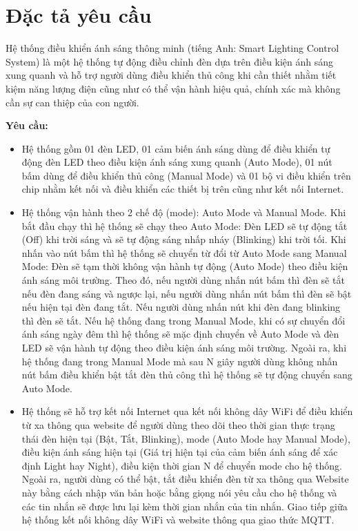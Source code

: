 \section{Đặc tả yêu cầu}
Hệ thống điều khiển ánh sáng thông minh (tiếng Anh: Smart Lighting Control System) là một hệ thống tự động điều chỉnh đèn dựa trên điều kiện ánh sáng xung quanh và hỗ trợ người dùng điều khiển thủ công khi cần thiết nhằm tiết kiệm năng lượng điện cũng như có thể vận hành hiệu quả, chính xác mà không cần sự can thiệp của con người.    

\textbf{Yêu cầu: }
\begin{itemize}
    \item Hệ thống gồm 01 đèn LED, 01 cảm biến ánh sáng dùng để điều khiển tự động đèn LED theo điều kiện ánh sáng xung quanh (Auto Mode), 01 nút bấm dùng để điều khiển thủ công (Manual Mode) và 01 bộ vi điều khiển trên chip nhằm kết nối và điều khiển các thiết bị trên cũng như kết nối Internet.
    \item Hệ thống vận hành theo 2 chế độ (mode): Auto Mode và Manual Mode. Khi bắt đầu chạy thì hệ thống sẽ chạy theo Auto Mode: Đèn LED sẽ tự động tắt (Off) khi trời sáng và sẽ tự động sáng nhấp nháy (Blinking) khi trời tối. Khi nhấn vào nút bấm thì hệ thống sẽ chuyển từ đổi từ Auto Mode sang Manual Mode: Đèn sẽ tạm thời không vận hành tự động (Auto Mode) theo điều kiện ánh sáng môi trường. Theo đó, nếu người dùng nhấn nút bấm thì đèn sẽ tắt nếu đèn đang sáng và ngược lại, nếu người dùng nhấn nút bấm thì đèn sẽ bật nếu hiện tại đèn đang tắt. Nếu người dùng nhấn nút khi đèn đang blinking thì đèn sẽ tắt. Nếu hệ thống đang trong Manual Mode, khi có sự chuyển đổi ánh sáng ngày đêm thì hệ thống sẽ mặc định chuyển về Auto Mode và đèn LED sẽ vận hành tự động theo điều kiện ánh sáng môi trường. Ngoài ra, khi hệ thống đang trong Manual Mode mà sau N giây người dùng không nhấn nút bấm điều khiển bật tắt đèn thủ công thì hệ thống sẽ tự động chuyển sang Auto Mode. 
    \item Hệ thống sẽ hỗ trợ kết nối Internet qua kết nối không dây WiFi để điều khiển từ xa thông qua website để người dùng theo dõi theo thời gian thực trạng thái đèn hiện tại (Bật, Tắt, Blinking), mode (Auto Mode hay Manual Mode), điều kiện ánh sáng hiện tại (Giá trị hiện tại của cảm biến ánh sáng để xác định Light hay Night), điều kiện thời gian N để chuyển mode cho hệ thống. Ngoài ra, người dùng có thể bật, tắt điều khiển đèn từ xa thông qua Website này bằng cách nhập văn bản hoặc bằng giọng nói yêu cầu cho hệ thống và các tin nhắn sẽ được lưu lại kèm thời gian nhắn của tin nhắn. Giao tiếp giữa hệ thống kết nối không dây WiFi và website thông qua giao thức MQTT.  
\end{itemize}

